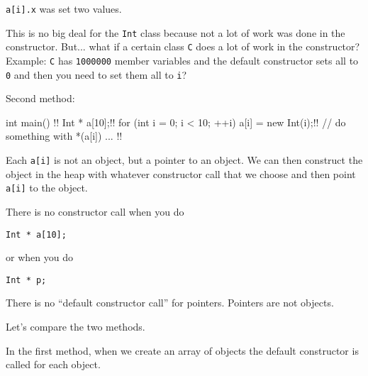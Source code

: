  \texttt{a[i].x} was set two values.

This is no big deal for the \texttt{Int} class because not a lot of work
was done in the constructor. But... what if a certain class \texttt{C}
does a lot of work in the constructor? Example: \texttt{C} has
\texttt{1000000} member variables and the default constructor sets all to
\texttt{0} and then you need to set them all to \texttt{i}?

Second method:
\begin{consolethree}[escapeinside=!!]
int main()
{   !!
    Int * a[10];!! 
    for (int i = 0; i < 10; ++i)
        a[i] = new Int(i);!!
    // do something with *(a[i])
    ... !!
}
\end{consolethree}

 Each \texttt{a[i]} is not an object, but a pointer
to an object. We can then construct the object in the heap with whatever
constructor call that we choose and then point \texttt{a[i]} to the
object.

There is no constructor call when you do
\begin{center}
\texttt{Int * a[10];}
\end{center}
or when you do
\begin{center}
\texttt{Int * p;}
\end{center}
 There is no ``default constructor call'' for
pointers. Pointers are not objects.

Let's compare the two methods.

In the first method, when we create an array of objects the default
constructor is called for each object.

